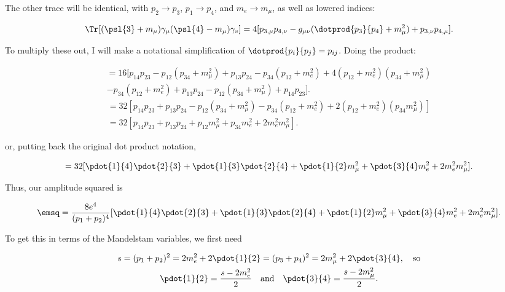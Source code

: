 The other trace will be identical, with $p_2 \rightarrow p_3$, $p_1 \rightarrow p_4$, and $m_e \rightarrow m_{\mu}$, as well as lowered indices:

\begin{equation*}
    \Tr[(\psl{3} + m_{\mu})\gamma_{\mu}(\psl{4} - m_{\mu})\gamma_v] = 4[p_{3,\mu}p_{4,\nu} - g_{\mu\nu}(\dotprod{p_3}{p_4} + m_{\mu}^2) + p_{3,\nu}p_{4,\mu}].
\end{equation*}

To multiply these out, I will make a notational simplification of $\dotprod{p_i}{p_j} = p_{ij}$. Doing the product:

\begin{multline*}
    = 16[p_{14}p_{23} - p_{12}(p_{34} + m_{\mu}^2) + p_{13}p_{24} - p_{34}(p_{12} + m_e^2) + 4(p_{12} + m_e^2)(p_{34} + m_{\mu}^2) \\ - p_{34}(p_{12} + m_e^2) + p_{13}p_{24} - p_{12}(p_{34} + m_{\mu}^2) + p_{14}p_{23}].
\end{multline*}
\begin{gather*}
    = 32[p_{14}p_{23} + p_{13}p_{24} - p_{12}(p_{34} + m_{\mu}^2) - p_{34}(p_{12} + m_e^2) + 2(p_{12} + m_e^2)(p_{34}m_{\mu}^2)] \\
    = 32[p_{14}p_{23} + p_{13}p_{24} + p_{12}m_{\mu}^2 + p_{34}m_e^2 + 2m_e^2m_{\mu}^2].
\end{gather*}

or, putting back the original dot product notation,

\begin{equation*}
    = 32[\pdot{1}{4}\pdot{2}{3} + \pdot{1}{3}\pdot{2}{4} + \pdot{1}{2}m_{\mu}^2 + \pdot{3}{4}m_e^2 + 2m_e^2m_{\mu}^2].
\end{equation*}

Thus, our amplitude squared is

\begin{equation*}
    \emsq = \frac{8e^4}{(p_1+p_2)^4}[\pdot{1}{4}\pdot{2}{3} + \pdot{1}{3}\pdot{2}{4} + \pdot{1}{2}m_{\mu}^2 + \pdot{3}{4}m_e^2 + 2m_e^2m_{\mu}^2].
\end{equation*}

To get this in terms of the Mandelstam variables, we first need

\begin{gather*}
    s = (p_1 + p_2)^2 = 2m_e^2 + 2\pdot{1}{2} = (p_3+p_4)^2 = 2m_{\mu}^2 + 2\pdot{3}{4}, \quad \mathrm{so} \\
    \pdot{1}{2} = \frac{s-2m_e^2}{2} \quad\mathrm{and}\quad \pdot{3}{4} = \frac{s-2m_{\mu}^2}{2}.
\end{gather*}

